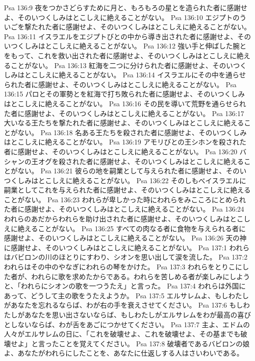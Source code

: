 Psa 136:9  夜をつかさどらすために月と、もろもろの星とを造られた者に感謝せよ、そのいつくしみはとこしえに絶えることがない。
Psa 136:10  エジプトのういごを撃たれた者に感謝せよ、そのいつくしみはとこしえに絶えることがない。
Psa 136:11  イスラエルをエジプトびとの中から導き出された者に感謝せよ、そのいつくしみはとこしえに絶えることがない。
Psa 136:12  強い手と伸ばした腕とをもって、これを救い出された者に感謝せよ、そのいつくしみはとこしえに絶えることがない。
Psa 136:13  紅海を二つに分けられた者に感謝せよ、そのいつくしみはとこしえに絶えることがない。
Psa 136:14  イスラエルにその中を通らせられた者に感謝せよ、そのいつくしみはとこしえに絶えることがない。
Psa 136:15  パロとその軍勢とを紅海で打ち敗られた者に感謝せよ、そのいつくしみはとこしえに絶えることがない。
Psa 136:16  その民を導いて荒野を通らせられた者に感謝せよ、そのいつくしみはとこしえに絶えることがない。
Psa 136:17  大いなる王たちを撃たれた者に感謝せよ、そのいつくしみはとこしえに絶えることがない。
Psa 136:18  名ある王たちを殺された者に感謝せよ、そのいつくしみはとこしえに絶えることがない。
Psa 136:19  アモリびとの王シホンを殺された者に感謝せよ、そのいつくしみはとこしえに絶えることがない。
Psa 136:20  バシャンの王オグを殺された者に感謝せよ、そのいつくしみはとこしえに絶えることがない。
Psa 136:21  彼らの地を嗣業として与えられた者に感謝せよ、そのいつくしみはとこしえに絶えることがない。
Psa 136:22  そのしもべイスラエルに嗣業としてこれを与えられた者に感謝せよ、そのいつくしみはとこしえに絶えることがない。
Psa 136:23  われらが卑しかった時にわれらをみこころにとめられた者に感謝せよ、そのいつくしみはとこしえに絶えることがない。
Psa 136:24  われらのあだからわれらを助け出された者に感謝せよ、そのいつくしみはとこしえに絶えることがない。
Psa 136:25  すべての肉なる者に食物を与えられる者に感謝せよ、そのいつくしみはとこしえに絶えることがない。
Psa 136:26  天の神に感謝せよ、そのいつくしみはとこしえに絶えることがない。
Psa 137:1  われらはバビロンの川のほとりにすわり、シオンを思い出して涙を流した。
Psa 137:2  われらはその中のやなぎにわれらの琴をかけた。
Psa 137:3  われらをとりこにした者が、われらに歌を求めたからである。われらを苦しめる者が楽しみにしようと、「われらにシオンの歌を一つうたえ」と言った。
Psa 137:4  われらは外国にあって、どうして主の歌をうたえようか。
Psa 137:5  エルサレムよ、もしわたしがあなたを忘れるならば、わが右の手を衰えさせてください。
Psa 137:6  もしわたしがあなたを思い出さないならば、もしわたしがエルサレムをわが最高の喜びとしないならば、わが舌をあごにつかせてください。
Psa 137:7  主よ、エドムの人々がエルサレムの日に、「これを破壊せよ、これを破壊せよ、その基までも破壊せよ」と言ったことを覚えてください。
Psa 137:8  破壊者であるバビロンの娘よ、あなたがわれらにしたことを、あなたに仕返しする人はさいわいである。
